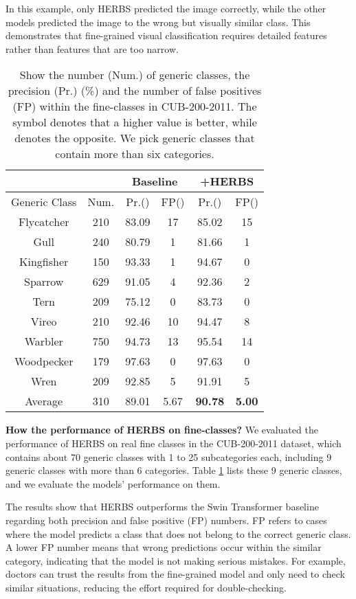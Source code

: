 \documentclass[journal]{IEEEtran}
\begin{document}
In this example, only HERBS predicted the image correctly, while the other models predicted the image to the wrong but visually similar class. This demonstrates that fine-grained visual classification requires detailed features rather than features that are too narrow.


\begin{table}
\begin{center}
\begin{tabular}{|c|c|c|c|c|c|}
\hline
\multicolumn{2}{|c|}{} & \multicolumn{2}{|c|}{Baseline} & \multicolumn{2}{|c|}{+HERBS}\\
\hline
Generic Class & Num. & Pr.() & FP()  & Pr.() & FP() \\
\hline
Flycatcher & 210 & 83.09 & 17 & 85.02 & 15\\
Gull & 240  & 80.79 & 1 & 81.66 & 1\\
Kingfisher & 150 & 93.33 & 1 & 94.67 & 0\\
Sparrow & 629 & 91.05 & 4 & 92.36 & 2\\
Tern & 209 & 75.12 & 0 & 83.73 & 0\\
Vireo & 210 & 92.46 & 10 & 94.47 & 8\\
Warbler & 750 & 94.73 & 13 & 95.54 & 14\\
Woodpecker & 179 & 97.63 & 0 & 97.63 & 0\\
Wren & 209 & 92.85 & 5 & 91.91 & 5\\
\hline
Average & 310 & 89.01 & 5.67 & \textbf{90.78} & \textbf{5.00}\\
\hline
\end{tabular}
\end{center}
\caption{Show the number (Num.) of generic classes, the precision (Pr.) (\%) and the number of false positives (FP) within the fine-classes in CUB-200-2011. The symbol  denotes that a higher value is better, while  denotes the opposite. We pick generic classes that contain more than six categories.}
\label{tab4}
\end{table}


\textbf{How the performance of HERBS on fine-classes?} We evaluated the performance of HERBS on real fine classes in the CUB-200-2011 dataset, which contains about 70 generic classes with 1 to 25 subcategories each, including 9 generic classes with more than 6 categories. Table \ref{tab4} lists these 9 generic classes, and we evaluate the models' performance on them.

The results show that HERBS outperforms the Swin Transformer baseline regarding both precision and false positive (FP) numbers. FP refers to cases where the model predicts a class that does not belong to the correct generic class. A lower FP number means that wrong predictions occur within the similar category, indicating that the model is not making serious mistakes. For example, doctors can trust the results from the fine-grained model and only need to check similar situations, reducing the effort required for double-checking.
\end{document}
